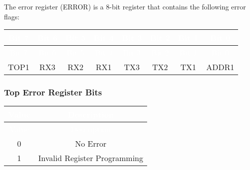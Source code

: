 The error register (ERROR) is a 8-bit register that contains the following error flags:
\renewcommand*{\arraystretch}{1.25}
\begingroup
\small
{}
\begin{longtable}{|c|c|c|c|c|c|c|c|}
    \hline
    \rowcolor{gray}
    \textcolor{white}{Bit 7} & \textcolor{white}{Bit 6} & \textcolor{white}{Bit 5} & \textcolor{white}{Bit 4} & \textcolor{white}{Bit 3} & \textcolor{white}{Bit 2} & \textcolor{white}{Bit 1} & \textcolor{white}{Bit 0} \\ \hline
    \endfirsthead

    \hline
    \rowcolor{gray}
    \textcolor{white}{Bit 7} & \textcolor{white}{Bit 6} & \textcolor{white}{Bit 5} & \textcolor{white}{Bit 4} & \textcolor{white}{Bit 3} & \textcolor{white}{Bit 2} & \textcolor{white}{Bit 1} & \textcolor{white}{Bit 0} \\ \hline
    \endhead

    \hline
    \endfoot

    TOP1 & RX3 & RX2 & RX1 & TX3 & TX2 & TX1 & ADDR1 \\ \hline
\end{longtable}
\label{table:uart_error}
\endgroup

\subsubsection{Top Error Register Bits}
\renewcommand*{\arraystretch}{1.25}
\begingroup
\small
{}
\begin{longtable}{|c|c|}
    \hline
    \rowcolor{gray}
    \textcolor{white}{Value} & \textcolor{white}{Description}  \\ \hline
    \endfirsthead

    \hline
    \rowcolor{gray}
    \textcolor{white}{Value} & \textcolor{white}{Description}  \\ \hline
    \endhead

    \hline
    \endfoot

    0 & No Error \\ \hline
    1 & Invalid Register Programming \\ \hline
\end{longtable}
\label{table:uart_top_error}
\endgroup

